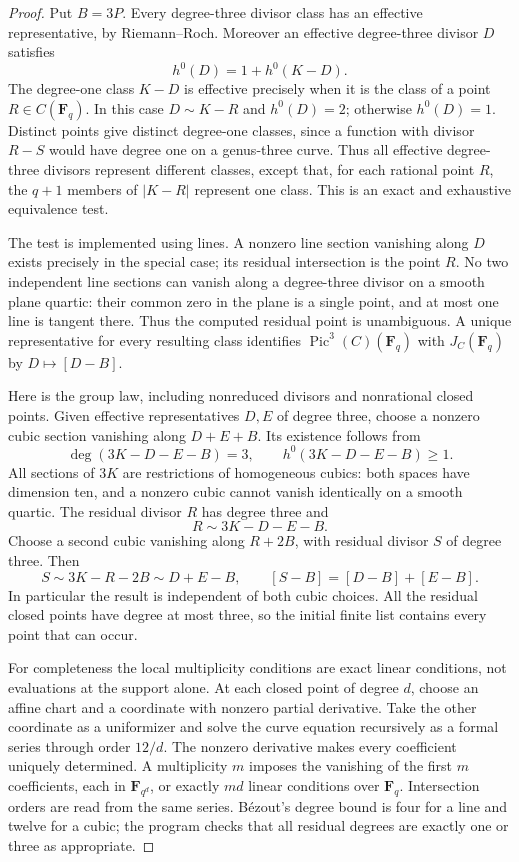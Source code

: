 \documentclass[11pt]{article}
\begin{document}
\begin{proof}
Put $B=3P$. Every degree-three divisor class has an effective
representative, by Riemann--Roch. Moreover an effective
degree-three divisor $D$ satisfies
\[
             h^0(D)=1+h^0(K-D).
\]
The degree-one class $K-D$ is effective precisely when it is
the class of a point $R\in C(\mathbf F_q)$. In this case
$D\sim K-R$ and $h^0(D)=2$; otherwise $h^0(D)=1$.
Distinct points give distinct degree-one classes, since a
function with divisor $R-S$ would have degree one on a
genus-three curve. Thus all effective degree-three divisors
represent different classes, except that, for each rational
point $R$, the $q+1$ members of $|K-R|$ represent one class.
This is an exact and exhaustive equivalence test.

The test is implemented using lines. A nonzero line section
vanishing along $D$ exists precisely in the special case;
its residual intersection is the point $R$. No two independent
line sections can vanish along a degree-three divisor on a
smooth plane quartic: their common zero in the plane is a
single point, and at most one line is tangent there. Thus
the computed residual point is unambiguous. A unique
representative for every resulting class identifies
$\operatorname{Pic}^3(C)(\mathbf F_q)$ with
$J_C(\mathbf F_q)$ by $D\mapsto[D-B]$.

Here is the group law, including nonreduced divisors and
nonrational closed points. Given effective representatives
$D,E$ of degree three, choose a nonzero cubic section
vanishing along $D+E+B$. Its existence follows from
\[
 \deg(3K-D-E-B)=3,\qquad h^0(3K-D-E-B)\ge1.
\]
All sections of $3K$ are restrictions of homogeneous cubics:
both spaces have dimension ten, and a nonzero cubic cannot
vanish identically on a smooth quartic. The residual divisor
$R$ has degree three and
\[
                         R\sim3K-D-E-B.
\]
Choose a second cubic vanishing along $R+2B$, with residual
divisor $S$ of degree three. Then
\[
 S\sim3K-R-2B\sim D+E-B,
 \qquad [S-B]=[D-B]+[E-B].
\]
In particular the result is independent of both cubic choices.
All the residual closed points have degree at most three,
so the initial finite list contains every point that can occur.

For completeness the local multiplicity conditions are exact
linear conditions, not evaluations at the support alone. At
each closed point of degree $d$, choose an affine chart and
a coordinate with nonzero partial derivative. Take the other
coordinate as a uniformizer and solve the curve equation
recursively as a formal series through order $12/d$.
The nonzero derivative makes every coefficient uniquely
determined. A multiplicity $m$ imposes the vanishing of
the first $m$ coefficients, each in $\mathbf F_{q^d}$,
or exactly $md$ linear conditions over $\mathbf F_q$.
Intersection orders are read from the same series. B\'ezout's
degree bound is four for a line and twelve for a cubic;
the program checks that all residual degrees are exactly
one or three as appropriate.


\end{proof}
\end{document}

